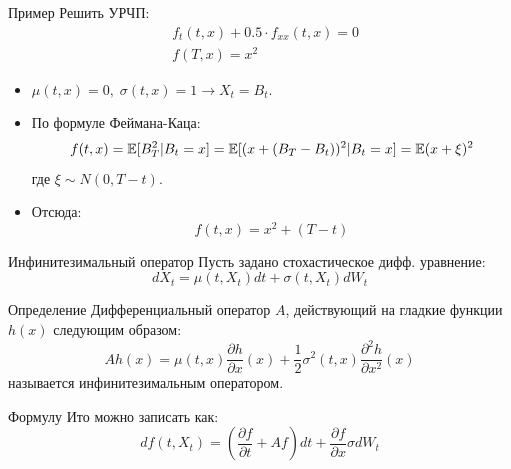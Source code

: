 \documentclass[aspectratio=169]{beamer}
\begin{document}
\begin{frame}{Пример}
    Решить УРЧП:
    \begin{align*}
        &f_t(t, x) + 0.5 \cdot f_{xx}(t, x)  = 0 \\
        &f(T, x) = x^2
    \end{align*}

    \pause
    \begin{itemize}
        \item $\mu(t, x) = 0, \; \sigma(t, x) = 1 \to X_t = B_t$. 

        \item По формуле Феймана-Каца:
        $$
            f(t, x) = \mathbb{E}[B_T^2 | B_t = x] = \mathbb{E}[ (x + (B_T-B_t))^2 | B_t = x ] = \mathbb{E}(x+\xi)^2
        $$где $\xi \sim N(0, T-t)$.

        \item Отсюда:
        $$
            f(t, x) = x^2 + (T-t)
        $$
    \end{itemize}
\end{frame}


\begin{frame}{Инфинитезимальный оператор}
    Пусть задано стохастическое дифф. уравнение:
    $$
        dX_t = \mu(t, X_t) dt + \sigma(t, X_t) dW_t
    $$
    \begin{block}{Определение}
    Дифференциальный оператор $A$, действующий на гладкие функции $h(x)$ следующим образом:
    $$
        Ah(x) = \mu(t, x) \dfrac{\partial h}{\partial x}(x) + \dfrac{1}{2}\sigma^2(t, x) \dfrac{\partial^2 h}{\partial x^2}(x)
    $$ называется инфинитезимальным оператором.        
    \end{block}

    Формулу Ито можно записать как:
    $$
        df(t, X_t)=\left(\dfrac{\partial f}{\partial t}+Af\right)dt +\dfrac{\partial f}{\partial x}\sigma dW_t
    $$

\end{frame}
\end{document}
